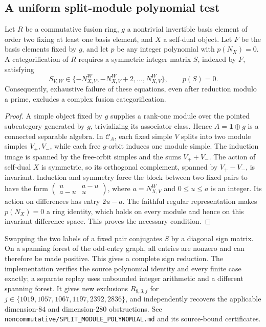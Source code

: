 \subsection{A uniform split-module polynomial test}
\label{subsec:m3-split-polynomial}
\begin{proposition}
Let $R$ be a commutative fusion ring, $g$ a nontrivial invertible basis
element of order two fixing at least one basis element, and $X$ a self-dual
object. Let $F$ be the basis elements fixed by $g$, and let $p$ be any
integer polynomial with $p(N_X)=0$. A categorification of $R$ requires a
symmetric integer matrix $S$, indexed by $F$, satisfying
\[
 S_{V,W}\in\{-N_{X,V}^{W},-N_{X,V}^{W}+2,\ldots,N_{X,V}^{W}\},
 \qquad p(S)=0.
\]
Consequently, exhaustive failure of these equations, even after reduction
modulo a prime, excludes a complex fusion categorification.
\end{proposition}
\begin{proof}
A simple object fixed by $g$ supplies a rank-one module over the pointed
subcategory generated by $g$, trivializing its associator class. Hence
$A=\mathbf1\oplus g$ is a connected separable algebra. In $\mathcal C_A$,
each fixed simple $V$ splits into two module simples $V_+,V_-$, while each
free $g$-orbit induces one module simple. The induction image is spanned by
the free-orbit simples and the sums $V_++V_-$. The action of self-dual $X$
is symmetric, so its orthogonal complement, spanned by $V_+-V_-$, is
invariant. Induction and symmetry force the block between two fixed pairs
to have the form
$\left(\begin{smallmatrix}u&a-u\\a-u&u\end{smallmatrix}\right)$,
where $a=N_{X,V}^{W}$ and $0\leq u\leq a$ is an integer. Its action on
differences has entry $2u-a$. The faithful regular representation makes
$p(N_X)=0$ a ring identity, which holds on every module and hence on this
invariant difference space. This proves the necessary condition.
\end{proof}
Swapping the two labels of a fixed pair conjugates $S$ by a diagonal sign
matrix. On a spanning forest of the odd-entry graph, all entries are
nonzero and can therefore be made positive. This gives a complete sign
reduction. The implementation verifies the source polynomial identity
and every finite case exactly; a separate replay uses unbounded integer
arithmetic and a different spanning forest. It gives new exclusions
$R_{8,3,j}$ for
$j\in\{1019,1057,1067,1197,2392,2836\}$, and independently recovers the
applicable dimension-$84$ and dimension-$280$ obstructions. See
\texttt{noncommutative/SPLIT\_MODULE\_POLYNOMIAL.md} and its source-bound
certificates.
